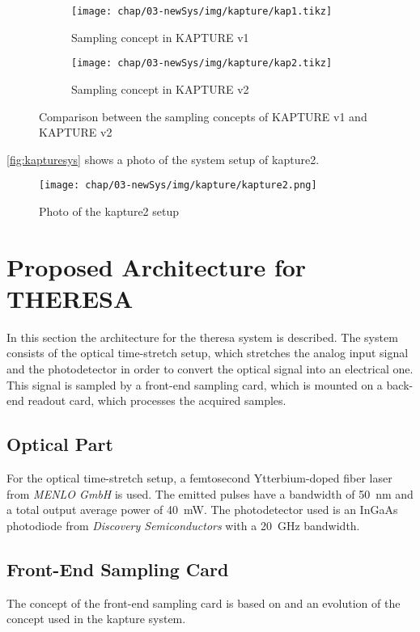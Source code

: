 \begin{figure}[H]
	\centering
	\begin{subfigure}{0.48\textwidth}
		\centering
		\texttt{[image: chap/03-newSys/img/kapture/kap1.tikz]}  
		\caption{Sampling concept in KAPTURE v1}
		\label{fig:kap1}
	\end{subfigure}
	\hfill
	\begin{subfigure}{0.48\textwidth}
		\centering
		\texttt{[image: chap/03-newSys/img/kapture/kap2.tikz]}  
		\caption{Sampling concept in KAPTURE v2}
		\label{fig:kap2}
	\end{subfigure}
	\caption[Comparison between KAPTURE v1 and KAPTURE v2]{Comparison between the sampling concepts of KAPTURE v1 and KAPTURE v2}
	\label{fig:kap1_vs_kap2}
\end{figure}
\autoref{fig:kapturesys} shows a photo of the system setup of \gls{kapture2}.
\begin{figure}[H]
	\centering
	\texttt{[image: chap/03-newSys/img/kapture/kapture2.png]}
	\caption[Photo of KAPTURE v2 system]{Photo of the \gls{kapture2} setup}
	\label{fig:kapturesys}
\end{figure}


\newpage
\section{Proposed Architecture for THERESA}
In this section the architecture for the \gls{theresa} system is described.
The system consists of the optical time-stretch setup, which stretches the analog input signal and the photodetector in order to convert the optical signal into an electrical one.
This signal is sampled by a front-end sampling card, which is mounted on a back-end readout card, which processes the acquired samples.

\subsection*{Optical Part}
For the optical time-stretch setup, a femtosecond Ytterbium-doped fiber laser from \textit{MENLO GmbH} is used. The emitted pulses have a bandwidth of \SI{50}{\nano \meter} and a total output average power of \SI{40}{\milli \watt}.
The photodetector used is an InGaAs photodiode from \textit{Discovery Semiconductors} with a \SI{20}{\GHz} bandwidth.

\subsection{Front-End Sampling Card}
The concept of the front-end sampling card is based on and an evolution of the concept used in the \gls{kapture} system. 

